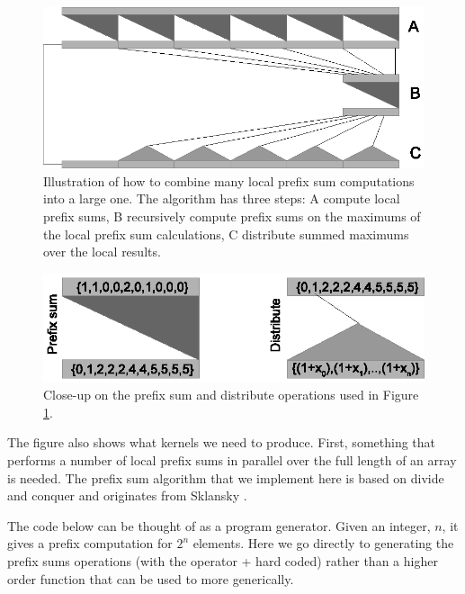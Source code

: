 \begin{figure}
\includegraphics[width=\linewidth]{./csort/prefixsum}
\caption{Illustration of how to combine many local prefix sum computations 
 into a large one. The algorithm has three steps: A compute local prefix sums, 
 B recursively compute prefix sums on the maximums of the local prefix sum 
 calculations, C distribute summed maximums over the local results.}
\label{fig:prefixsum}
\end{figure}

\begin{figure} 
\begin{center}
\includegraphics[width=\linewidth]{./csort/prefixzoom}
\caption{Close-up on the prefix sum and distribute operations used in Figure \ref{fig:prefixsum}.} 
\label{fig:prefixzoom}
\end{center}
\end{figure}

The figure also shows what kernels we need to produce. First, something that 
performs a number of local prefix sums in parallel over the full length 
of an array is needed. The prefix sum algorithm that we implement here is 
based on divide and conquer and originates from Sklansky \cite{Sklansky}. 

The code below can be thought of as a program generator. Given an integer, $n$,
it gives a prefix computation for $2^n$ elements. Here we go directly to 
generating the prefix sums operations (with the operator + hard coded) rather 
than a higher order function that can be used to more generically.

